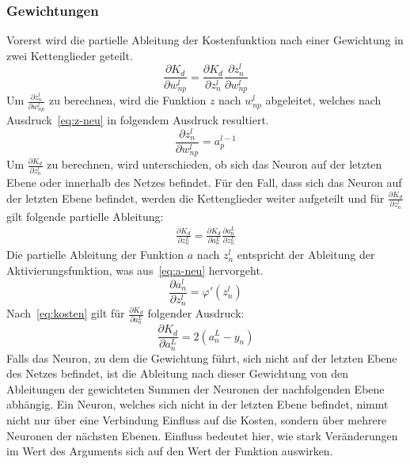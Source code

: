 \subsubsection{Gewichtungen}
Vorerst wird die partielle Ableitung der Kostenfunktion nach einer Gewichtung in zwei Kettenglieder geteilt.
\begin{equation}
    \frac{\partial K_d}{\partial w^l_{n p}} = \frac{\partial K_d}{\partial z^l_n} \frac{\partial z^l_n}{\partial w^l_{n p}}
    \label{eq:K-w}
\end{equation}
Um $\frac{\partial z^l_n}{\partial w^l_{n p}}$ zu berechnen, wird die Funktion $z$ nach $w^l_{n p}$ abgeleitet, welches nach Ausdruck~\eqref{eq:z-neu} in folgendem Ausdruck resultiert.
\begin{equation}
    \frac{\partial z^l_n}{\partial w^l_{n p}} = a^{l-1}_p
    \label{eq:z-w}
\end{equation}
Um $\frac{\partial K_d}{\partial z^l_n}$ zu berechnen, wird unterschieden, ob sich das Neuron auf der letzten Ebene oder innerhalb des Netzes befindet.
Für den Fall, dass sich das Neuron auf der letzten Ebene befindet, werden die Kettenglieder weiter aufgeteilt und für $\frac{\partial K_d}{\partial z^l_n}$ gilt folgende partielle Ableitung:
\begin{align}
    \frac{\partial K_d}{\partial z^L_n} = \frac{\partial K_d}{\partial a^L_n} \frac{\partial a^L_n}{\partial z^L_n}
    \label{eq:K-z-letzte-ebene}
\end{align}
Die partielle Ableitung der Funktion $a$ nach $z^l_n$ entspricht der Ableitung der Aktivierungsfunktion, was aus~\eqref{eq:a-neu} hervorgeht.
\begin{equation}
    \frac{\partial a^l_n}{\partial z^l_n} = \varphi'(z^l_n)
    \label{eq:a-z}
\end{equation}
Nach~\eqref{eq:kosten} gilt für $\frac{\partial K_d}{\partial a^L_n}$ folgender Ausdruck:
\begin{equation}
    \frac{\partial K_d}{\partial a^L_n} = 2(a^L_n - y_n)
    \label{eq:K-a}
\end{equation}
Falls das Neuron, zu dem die Gewichtung führt, sich nicht auf der letzten Ebene des Netzes befindet, ist die Ableitung nach dieser Gewichtung von den Ableitungen der gewichteten Summen der Neuronen der nachfolgenden Ebene abhängig.
Ein Neuron, welches sich nicht in der letzten Ebene befindet, nimmt nicht nur über eine Verbindung Einfluss auf die Kosten, sondern über mehrere Neuronen der nächsten Ebenen.
Einfluss bedeutet hier, wie stark Veränderungen im Wert des Arguments sich auf den Wert der Funktion auswirken.
